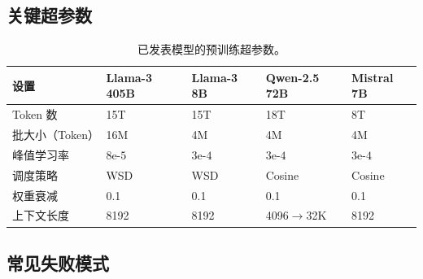 \subsection{关键超参数}
\label{key-hyperparameters}

\begin{table}[ht!]
\centering\small
\caption{已发表模型的预训练超参数。}
\begin{tabular}{@{}l l l l l@{}}
\toprule
\textbf{设置} & \textbf{Llama-3 405B} & \textbf{Llama-3 8B} & \textbf{Qwen-2.5 72B} & \textbf{Mistral 7B} \\
\midrule
Token 数 & 15T & 15T & 18T & 8T \\
批大小（Token） & 16M & 4M & 4M & 4M \\
峰值学习率 & $8\text{e-}5$ & $3\text{e-}4$ & $3\text{e-}4$ & $3\text{e-}4$ \\
调度策略 & WSD & WSD & Cosine & Cosine \\
权重衰减 & 0.1 & 0.1 & 0.1 & 0.1 \\
上下文长度 & 8192 & 8192 & 4096$\to$32K & 8192 \\
\bottomrule
\end{tabular}
\end{table}

\subsection{常见失败模式}
\label{common-failure-modes}

